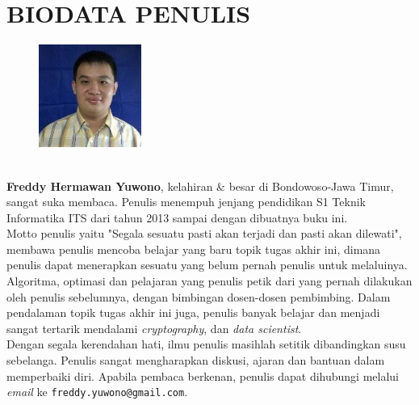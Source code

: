 \chapter{BIODATA PENULIS}
		\begin{figure}
			\includegraphics[width=0.3\textwidth]{images/foto-diri.jpg}
		\end{figure}
		\textbf{\ \\Freddy Hermawan Yuwono}, kelahiran \& besar di Bondowoso-Jawa Timur, sangat suka membaca. Penulis menempuh jenjang pendidikan S1 Teknik Informatika ITS dari tahun 2013 sampai dengan dibuatnya buku ini.\\
		
		\indent Motto penulis yaitu "Segala sesuatu pasti akan terjadi dan pasti akan dilewati", membawa penulis mencoba belajar yang baru topik tugas akhir ini, dimana penulis dapat menerapkan sesuatu yang belum pernah penulis untuk melaluinya. Algoritma, optimasi dan pelajaran yang penulis petik dari yang pernah dilakukan oleh penulis sebelumnya, dengan bimbingan dosen-dosen pembimbing. Dalam pendalaman topik tugas akhir ini juga, penulis banyak belajar dan menjadi sangat tertarik mendalami \textit{cryptography}, dan \textit{data scientist}. \\
		\indent Dengan segala kerendahan hati, ilmu penulis masihlah setitik dibandingkan susu sebelanga. Penulis sangat mengharapkan diskusi, ajaran dan bantuan dalam memperbaiki diri. Apabila pembaca berkenan, penulis dapat dihubungi melalui \textit{email} ke \texttt{freddy.yuwono@gmail.com}.


